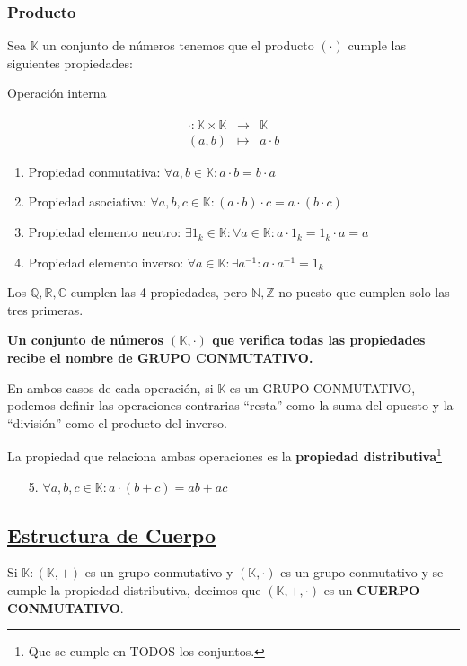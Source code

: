 \documentclass[10pt,a4paper,openright]{book}
\theoremstyle{break}
\begin{document}
\subsubsection{Producto}
Sea $\mathbb K$ un conjunto de números tenemos que el producto $(\cdot)$ cumple las siguientes propiedades:
\begin{center}
Operación interna
\end{center}
\begin{eqnarray*}
\cdot: \mathbb K \times\mathbb K & \stackrel{\cdot}{\rightarrow} & \mathbb K \\
(a,b) & \longmapsto  & a\cdot b
\end{eqnarray*}

\begin{enumerate}
\item Propiedad conmutativa: $\forall a, b \in \mathbb K: a\cdot b=b\cdot a$
\item Propiedad asociativa: $\forall a, b, c\in \mathbb K : (a\cdot b)\cdot c=a\cdot (b\cdot c)$
\item Propiedad elemento neutro: $\exists 1_k\in \mathbb K : \forall a \in \mathbb K : a\cdot 1_k=1_k\cdot a=a$
\item Propiedad elemento inverso: $\forall a \in \mathbb K : \exists a^{-1} : a\cdot a^{-1}=1_k$
\end{enumerate}
Los $\mathbb {Q, R, C}$ cumplen las 4 propiedades, pero $\mathbb {N,Z}$ no puesto que cumplen solo las tres primeras.\par
\textbf{Un conjunto de números $(\mathbb K, \cdot)$ que verifica todas las propiedades recibe el nombre de GRUPO CONMUTATIVO.}\par
En ambos casos de cada operación, si $\mathbb K$ es un GRUPO CONMUTATIVO, podemos definir las operaciones contrarias ``resta'' como la suma del opuesto y la ``división'' como el producto del inverso.\par
La propiedad que relaciona ambas operaciones es la \textbf{propiedad distributiva}\footnote{Que se cumple en TODOS los conjuntos.}
\begin{enumerate}
\item[5.] $\forall a,b,c\in \mathbb K: a\cdot (b+c)=ab+ac$
\end{enumerate}

\subsection{\underline{Estructura de Cuerpo}}
Si $\mathbb K : (\mathbb K, +)$ es un grupo conmutativo y $(\mathbb K, \cdot)$ es un grupo conmutativo y se cumple la propiedad distributiva, decimos que $(\mathbb K, +, \cdot)$ es un \textbf{CUERPO CONMUTATIVO}.
\end{document}
